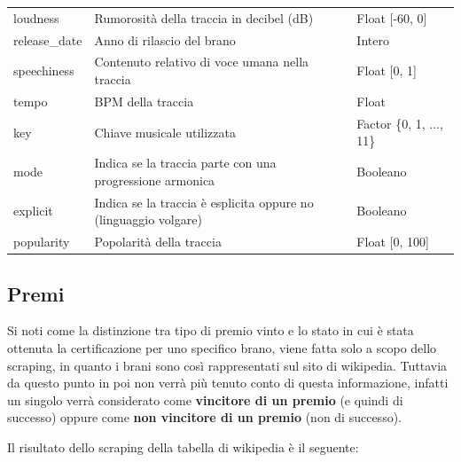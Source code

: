 \begin{center}
{\begin{tabular}[H]{ |l|l|l| }
			loudness & 
			Rumorosità della traccia in decibel (dB) &
			Float [-60, 0]\\
			
			release\_date & 
			Anno di rilascio del brano&
			Intero\\
			
			speechiness & 
			Contenuto relativo di voce umana nella traccia &
			Float [0, 1]\\
			
			tempo & 
			BPM della traccia &
			Float\\
			
			key & 
			Chiave musicale utilizzata &
			Factor \{0, 1, ..., 11\}\\
			
			mode & 
			Indica se la traccia parte con una progressione armonica &
			Booleano\\
			
			explicit & 
			Indica se la traccia è esplicita oppure no (linguaggio volgare) &
			Booleano\\
			
			popularity & 
			Popolarità della traccia &
			Float [0, 100]\\
			
			\hline
			
		\end{tabular}
	}
\end{center}



\subsection{Premi}
Si noti come la distinzione tra tipo di premio vinto e lo stato in cui è stata ottenuta la certificazione per uno specifico brano, viene fatta solo a scopo dello scraping, in quanto i brani sono così rappresentati sul sito di wikipedia. Tuttavia da questo punto in poi non verrà più tenuto conto di questa informazione, infatti un singolo verrà considerato come\textbf{ vincitore di un premio} (e quindi di successo) oppure come \textbf{non vincitore di un premio} (non di successo). 

Il risultato dello scraping della tabella di wikipedia è il seguente:



